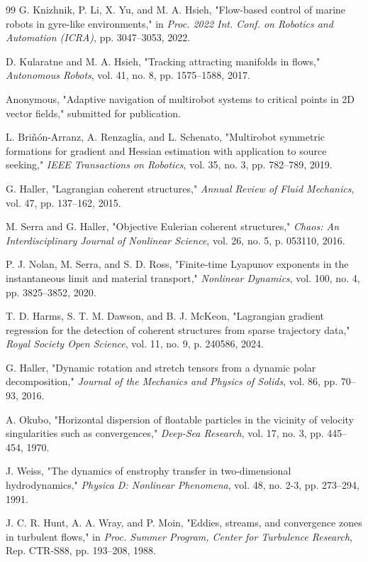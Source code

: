 \documentclass[lettersize,journal]{IEEEtran}
\begin{document}
\begin{thebibliography}{99}
 G. Knizhnik, P. Li, X. Yu, and M. A. Hsieh, "Flow-based control
of marine robots in gyre-like environments," in \textit{Proc. 2022 Int. Conf.
on Robotics and Automation (ICRA)}, pp. 3047--3053, 2022.

 D. Kularatne and M. A. Hsieh, "Tracking attracting manifolds in
flows," \textit{Autonomous Robots}, vol. 41, no. 8, pp. 1575--1588, 2017.

 Anonymous, "Adaptive navigation of multirobot systems to
critical points in 2D vector fields," submitted for publication.

 L. Briñón-Arranz, A. Renzaglia, and L. Schenato, "Multirobot
symmetric formations for gradient and Hessian estimation with application to
source seeking," \textit{IEEE Transactions on Robotics}, vol. 35, no. 3,
pp. 782--789, 2019.

 G. Haller, "Lagrangian coherent structures," \textit{Annual
Review of Fluid Mechanics}, vol. 47, pp. 137--162, 2015.

 M. Serra and G. Haller, "Objective Eulerian coherent
structures," \textit{Chaos: An Interdisciplinary Journal of Nonlinear
Science}, vol. 26, no. 5, p. 053110, 2016.

 P. J. Nolan, M. Serra, and S. D. Ross, "Finite-time Lyapunov
exponents in the instantaneous limit and material transport,"
\textit{Nonlinear Dynamics}, vol. 100, no. 4, pp. 3825--3852, 2020.

 T. D. Harms, S. T. M. Dawson, and B. J. McKeon, "Lagrangian
gradient regression for the detection of coherent structures from sparse
trajectory data," \textit{Royal Society Open Science}, vol. 11, no. 9,
p. 240586, 2024.

 G. Haller, "Dynamic rotation and stretch tensors from a
dynamic polar decomposition," \textit{Journal of the Mechanics and Physics
of Solids}, vol. 86, pp. 70--93, 2016.

 A. Okubo, "Horizontal dispersion of floatable particles in the
vicinity of velocity singularities such as convergences," \textit{Deep-Sea
Research}, vol. 17, no. 3, pp. 445--454, 1970.

 J. Weiss, "The dynamics of enstrophy transfer in two-dimensional
hydrodynamics," \textit{Physica D: Nonlinear Phenomena}, vol. 48, no. 2-3,
pp. 273--294, 1991.

 J. C. R. Hunt, A. A. Wray, and P. Moin, "Eddies, streams, and
convergence zones in turbulent flows," in \textit{Proc. Summer Program,
Center for Turbulence Research}, Rep. CTR-S88, pp. 193--208, 1988.


\end{thebibliography}
\end{document}
